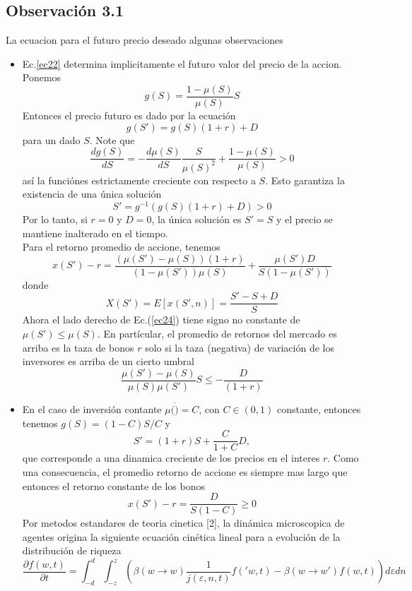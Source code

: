 \documentclass[12pt,a4paper]{article}
\begin{document}
\subsection*{Observación 3.1}
La ecuacion para el futuro precio deseado algunas observaciones 
\begin{itemize}
\item Ec.\ref{ec22} determina implicitamente el futuro valor del precio de la accion. Ponemos
$$
g(S)=\frac{1-\mu(S)}{\mu(S)}S
$$
Entonces el precio futuro es dado por la ecuación
$$
g(S') = g(S)(1+r)+D
$$
para un dado $S$. Note que
$$
\frac{dg(S)}{dS}=-\frac{d\mu(S)}{dS}\frac{S}{\mu(S)^2}+\frac{1-\mu(S)}{\mu(S)}>0
$$
así la funciónes estrictamente creciente con respecto a $S$. Esto garantiza la existencia de una única solución
\begin{equation}
S'=g^{-1}(g(S)(1+r)+D)>0
\end{equation}
Por lo tanto, si $r=0$ y $D=0$, la única solución es $S'=S$ y el precio se mantiene inalterado en el tiempo.\\
Para el retorno promedio de accione, tenemos
\begin{equation}
x(S')-r=\frac{(\mu(S')-\mu(S))(1+r)}{(1-\mu(S'))\mu(S)}+\frac{\mu(S')D}{S(1-\mu(S'))} \label{ec24}
\end{equation}
donde
\begin{equation}
X(S')= E[x(S',n)]=\frac{S'-S+D}{S}
\end{equation}
Ahora el lado derecho de Ec.(\ref{ec24}) tiene signo no constante de $\mu(S')\leq \mu(S) $. En partícular, el promedio de retornos del mercado es arriba es la taza de bonos $r$ solo si la taza (negativa) de variación de los inversores es arriba de un cierto umbral
$$
\frac{\mu(S')-\mu(S)}{\mu(S)\mu(S')}S\leq -\frac{D}{(1+r)}
$$
\item En el caso de inversión contante $\mu(\dot)=C$, con $C\in (0,1)$ constante, entonces tenemos $g(S)=(1-C)S/C$ y
$$
S'=(1+r)S+\frac{C}{1+C}D,
$$
que corresponde a una dinamica creciente de los precios en el interes $r$. Como una consecuencia, el promedio retorno de accione es siempre mas largo que entonces el retorno constante de los bonos
$$
x(S')-r=\frac{D}{S(1-C)}\geq 0
$$
\quad Por metodos estandares de teoria cinetica [2], la dinámica microscopica de agentes origina la siguiente ecuación cinética lineal para a evolución de la distribución de riqueza
\begin{equation}
\frac{\partial f(w,t)}{\partial t} = \int^{d}_{-d}\int^{z}_{-z} \left(\beta(w\rightarrow w) \frac{1}{j(\varepsilon,n,t)}f('w,t)-\beta(w\rightarrow w')f(w,t)\right)d\varepsilon dn

\end{equation}
\end{itemize}
\end{document}
